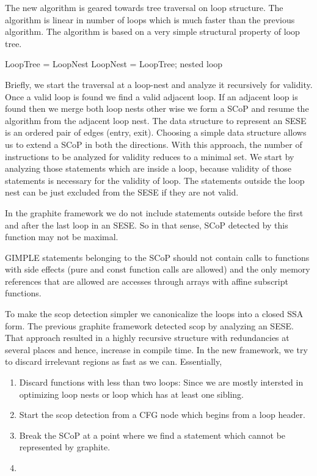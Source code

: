The new algorithm is geared towards tree traversal on loop structure. The algorithm is linear in number of loops
which is much faster than the previous algorithm. The algorithm is based on a very simple structural property of loop
tree.

LoopTree = LoopNest
LoopNest = LoopTree; nested loop

Briefly, we start the traversal at a loop-nest and analyze it recursively for validity. Once a valid loop is
found we find a valid adjacent loop. If an adjacent loop is found then we merge both loop nests
other wise we form a SCoP and resume the algorithm from the adjacent loop nest. The data structure to represent an SESE
is an ordered pair of edges (entry, exit). Choosing a simple data structure allows us to extend a SCoP in both the
directions. With this approach, the number of instructions to be analyzed for validity reduces to a minimal set.
We start by analyzing those statements which are inside a loop, because validity of those statements is
necessary for the validity of loop. The statements outside the loop nest can be just excluded from the
SESE if they are not valid.

In the graphite framework we do not include statements outside before the first and after the last loop in an SESE.
So in that sense, SCoP detected by this function may not be maximal.

GIMPLE statements belonging to the SCoP should not contain calls to functions with
side effects (pure and const function calls are allowed) and the only memory references
that are allowed are accesses through arrays with affine subscript functions.

To make the scop detection simpler we canonicalize the loops into a closed SSA form.
The previous graphite framework detected scop by analyzing an SESE. That approach resulted in a highly recursive structure
with redundancies at several places and hence, increase in compile time. In the new framework, we try to discard irrelevant
regions as fast as we can. Essentially,
\begin{enumerate}
\item Discard functions with less than two loops: Since we are mostly intersted in optimizing loop nests
or loop which has at least one sibling.
\item Start the scop detection from a CFG node which begins from a loop header.
\item Break the SCoP at a point where we find a statement which cannot be represented by graphite.
\item 
\end{enumerate}

